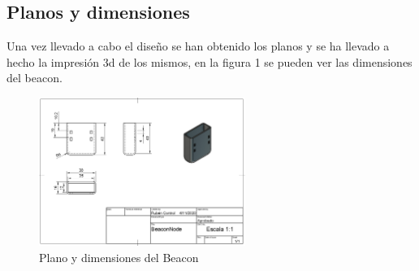 \documentclass[paper=a4, fontsize=11pt,twoside]{scrartcl}
\begin{document}
    \subsection{Planos y dimensiones}
        Una vez llevado a cabo el diseño se han obtenido los planos y se ha llevado a hecho la impresión 3d de los mismos, en la figura 1 
        se pueden ver las dimensiones del beacon.
        \begin{center}
            \begin{figure}[h]
                \centering
                \includegraphics[width=0.6\textwidth]{../model_beacon.PNG}
                \caption{Plano y dimensiones del Beacon}
                \label{fig:mesh1}
            \end{figure}
        \end{center}
\end{document}
